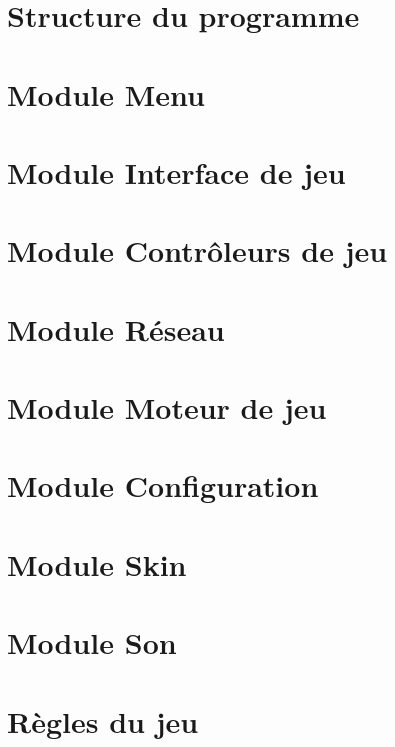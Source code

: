 \section{Structure du programme}%


\newpage

\section{Module Menu}

\newpage

\section{Module Interface de jeu}

\newpage

\section{Module Contrôleurs de jeu}

\newpage

\section{Module Réseau}

\newpage

\section{Module Moteur de jeu}

\newpage

\section{Module Configuration}

\newpage

\section{Module Skin}

\newpage

\section{Module Son}

\newpage

\appendix

\renewcommand{\appendixpagename}{Annexes}
\renewcommand{\appendixtocname}{Annexes}

\noappendicestocpagenum

\appendixpage
\addappheadtotoc

\section{Règles du jeu}

